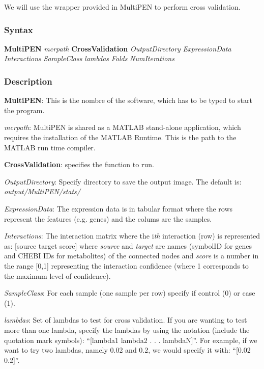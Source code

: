 \documentclass[11pt, oneside]{article}   	%
\begin{document}
We will use the wrapper provided in MultiPEN to perform cross validation. 

\subsubsection{Syntax}


\begin{framed}

   {\bf MultiPEN} {\it mcrpath} {\bf CrossValidation} {\it OutputDirectory} {\it ExpressionData} {\it Interactions} 
   {\it SampleClass} {\it lambdas} {\it Folds} {\it  NumIterations}

\end{framed}


\subsubsection{Description}


{\bf MultiPEN}:  This is the nombre of the software, which has to be typed to start the program.

{\it mcrpath}: MultiPEN is shared as a MATLAB stand-alone application, which requires the installation of the MATLAB Runtime. This is the path to the MATLAB run time compiler.

{\bf CrossValidation}: specifies the function to run.

{\it OutputDirectory}:  Specify directory to save the output image. The default is: {\it output/MultiPEN/stats/} 

{\it ExpressionData}: The expression data is in tabular format where the rows represent the features (e.g. genes) and the colums are the samples.

{\it Interactions}: The interaction matrix where the i{\it th} interaction (row) is represented as: [source target score] where {\it source} and {\it target} are names (symbolID for genes and CHEBI IDs for metabolites) of the connected nodes and {\it score} is a number in the range [0,1] representing the interaction confidence (where 1 corresponds to the maximum level of confidence).

{\it SampleClass}: For each sample (one sample per row) specify if control (0) or case (1).

{\it lambdas}: Set of lambdas to test for cross validation. If you are wanting to test more than one lambda, specify the lambdas by using the notation (include the quotation mark symbols): ``[lambda1 lambda2 . . . lambdaN]''. For example, if we want to try two lambdas, namely 0.02 and 0.2, we would specify it with: ``[0.02 0.2]''.
\end{document}
